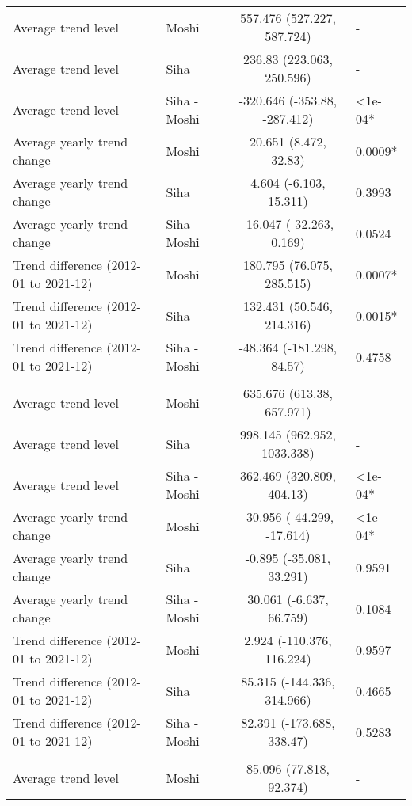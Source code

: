 \begin{longtable}{l|lcl}
\midrule\addlinespace[2.5pt]
\multicolumn{4}{l}{Diabetes Mellitus} \\[2.5pt] 
\midrule\addlinespace[2.5pt]
Average trend level & Moshi & 557.476 (527.227, 587.724) & - \\ 
Average trend level & Siha & 236.83 (223.063, 250.596) & - \\ 
Average trend level & Siha - Moshi & -320.646 (-353.88, -287.412) & <1e-04* \\ 
Average yearly trend change & Moshi & 20.651 (8.472, 32.83) & 0.0009* \\ 
Average yearly trend change & Siha & 4.604 (-6.103, 15.311) & 0.3993 \\ 
Average yearly trend change & Siha - Moshi & -16.047 (-32.263, 0.169) & 0.0524 \\ 
Trend difference (2012-01 to 2021-12) & Moshi & 180.795 (76.075, 285.515) & 0.0007* \\ 
Trend difference (2012-01 to 2021-12) & Siha & 132.431 (50.546, 214.316) & 0.0015* \\ 
Trend difference (2012-01 to 2021-12) & Siha - Moshi & -48.364 (-181.298, 84.57) & 0.4758 \\ 
\midrule\addlinespace[2.5pt]
\multicolumn{4}{l}{Gastrointestinal Infections} \\[2.5pt] 
\midrule\addlinespace[2.5pt]
Average trend level & Moshi & 635.676 (613.38, 657.971) & - \\ 
Average trend level & Siha & 998.145 (962.952, 1033.338) & - \\ 
Average trend level & Siha - Moshi & 362.469 (320.809, 404.13) & <1e-04* \\ 
Average yearly trend change & Moshi & -30.956 (-44.299, -17.614) & <1e-04* \\ 
Average yearly trend change & Siha & -0.895 (-35.081, 33.291) & 0.9591 \\ 
Average yearly trend change & Siha - Moshi & 30.061 (-6.637, 66.759) & 0.1084 \\ 
Trend difference (2012-01 to 2021-12) & Moshi & 2.924 (-110.376, 116.224) & 0.9597 \\ 
Trend difference (2012-01 to 2021-12) & Siha & 85.315 (-144.336, 314.966) & 0.4665 \\ 
Trend difference (2012-01 to 2021-12) & Siha - Moshi & 82.391 (-173.688, 338.47) & 0.5283 \\ 
\midrule\addlinespace[2.5pt]
\multicolumn{4}{l}{Infectious Eye Disease} \\[2.5pt] 
\midrule\addlinespace[2.5pt]
Average trend level & Moshi & 85.096 (77.818, 92.374) & - \\ 

\end{longtable}
